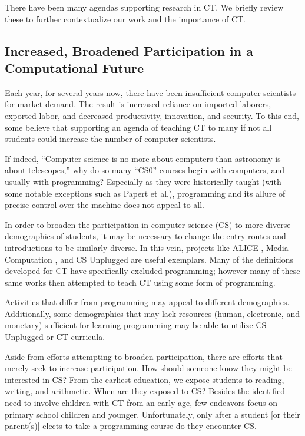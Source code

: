 \documentclass{acm_proc_article-sp}
\begin{document}
There have been many agendas supporting research in CT. We briefly review these to further contextualize our work and the importance of CT.

\subsection{Increased, Broadened Participation in a Computational Future}
\label{sec:recruitment}
Each year, for several years now, there have been insufficient computer scientists for market demand.
The result is increased reliance on imported laborers, exported labor, and decreased productivity, innovation, and security.
To this end, some believe that supporting an agenda of teaching CT to many if not all students could increase the number of computer scientists.

If indeed, ``Computer science is no more about computers than astronomy is about telescopes,''\cite{cs-astronomy} why do so many ``CS0'' courses begin with computers, and usually with programming? Especially as they were historically taught (with some notable exceptions such as Papert et al.)\cite{logo-readings}, programming and its allure of precise control over the machine does not appeal to all.

In order to broaden the participation in computer science (CS) to more diverse demographics of students, it may be necessary to change the entry routes and introductions to be similarly diverse. 
In this vein, projects like ALICE \cite{pausch1995alice}, Media Computation \cite{guzdial2003media}, and CS Unplugged \cite{csunplugged} are useful exemplars.
Many of the definitions developed for CT have specifically excluded programming; however many of these same works then attempted to teach CT using some form of programming.

Activities that differ from programming may appeal to different demographics.
Additionally, some demographics that may lack resources (human, electronic, and monetary) sufficient for learning programming may be able to utilize CS Unplugged or CT curricula.

Aside from efforts attempting to broaden participation, there are efforts that merely seek to increase participation.
How should someone know they might be interested in CS?
From the earliest education, we expose students to reading, writing, and arithmetic.
When are they exposed to CS?
Besides the identified need to involve children with CT from an early age, few endeavors focus on primary school children and younger.
Unfortunately, only after a student [or their parent(s)] elects to take a programming course do they encounter CS. 
\end{document}
